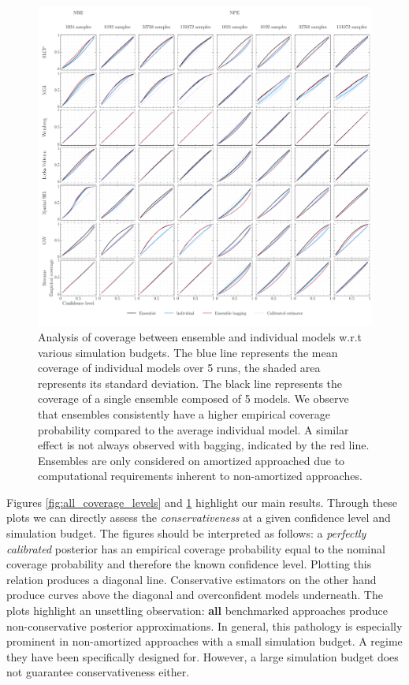 \documentclass[twoside]{article}
\begin{document}
\begin{figure}[h!]
    \includegraphics[width=\textwidth]{figures/coverage_multi_ensemble_with_bagging.pdf}
    \caption{Analysis of coverage between ensemble and individual models w.r.t various simulation budgets. The blue line represents the mean coverage of individual models over 5 runs, the shaded area represents its standard deviation. The black line represents the coverage of a single ensemble composed of 5 models. We observe that ensembles consistently have a higher empirical coverage probability compared to the average individual model. A similar effect is not always observed with bagging, indicated by the red line. Ensembles are only considered on amortized approached due to computational requirements inherent to non-amortized approaches.}
    \label{fig:coverage_ensemble}
\end{figure}
Figures \ref{fig:all_coverage_levels} and \ref{fig:coverage_ensemble} highlight our main results. Through these plots we can directly assess the \emph{conservativeness} at a given confidence level and simulation budget. The figures should be interpreted as follows: a \emph{perfectly calibrated} posterior has an empirical coverage probability equal to the nominal coverage probability and therefore the known confidence level. Plotting this relation produces a diagonal line. Conservative estimators on the other hand produce curves above the diagonal and overconfident models underneath.
The plots highlight an unsettling observation: {\bfseries all} benchmarked approaches produce non-conservative posterior approximations. In general, this pathology is especially prominent in non-amortized approaches with a small simulation budget. A regime they have been specifically designed for. However, a large simulation budget does not guarantee conservativeness either. 
\end{document}
